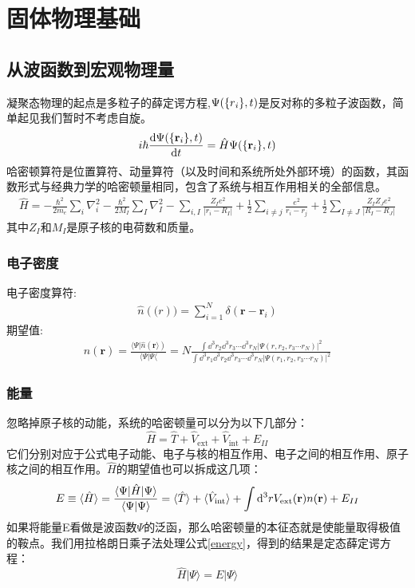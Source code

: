 \chapter{固体物理基础}
\section{从波函数到宏观物理量}
凝聚态物理的起点是多粒子的薛定谔方程,$\Psi(\{ \mathbf{\emph{$r$}}_i\},t)$是反对称的多粒子波函数，简单起见我们暂时不考虑自旋。
\begin{align}
    i\hbar\dv{\Psi(\{ \mathbf{r}_i\},t)}{t}=\hat{H}\Psi(\{ \mathbf{r}_i\},t)
    \label{hamiltonian}
\end{align}
哈密顿算符是位置算符、动量算符（以及时间和系统所处外部环境）的函数，其函数形式与经典力学的哈密顿量相同，包含了系统与相互作用相关的全部信息。
\begin{align}
    \hat{H}=-\frac{\hbar^2}{2m_e}\sum_i \nabla_{i}^{2}-\frac{\hbar^2}{2M_I}\sum_I \nabla_{I}^{2}-\sum_{i,I}\frac{Z_Ie^2}{|r_i-R_I|}+\frac{1}{2}\sum_{i\neq j}\frac{e^2}{r_i-r_j}+\frac{1}{2}\sum_{I\neq J}\frac{Z_IZ_Je^2}{|R_I-R_J|}
\end{align}
其中$Z_I$和$M_I$是原子核的电荷数和质量。
\subsection{电子密度}
电子密度算符:
\begin{gather}
    \hat{n}(\mathbf(r))=\sum_{i=1}^{N}\delta(\mathbf{r}-\mathbf{r}_i)
    \end{gather}
    期望值:
    \begin{gather}
    n(\mathbf{r})=\frac{\langle\Psi|\hat{n}(\mathbf{r}\rangle)}{\langle\Psi|\Psi\langle}
    =N\frac{\int \dd^3r_2\dd^3r_3\cdots\dd^3r_N|\Psi({r,r_2,r_3\cdots r_N})|^2}{\int \dd^3r_1\dd^3r_2\dd^3r_3\cdots\dd^3r_N|\Psi({r_1,r_2,r_3\cdots r_N})|^2}
\end{gather}
\subsection{能量}
忽略掉原子核的动能，系统的哈密顿量可以分为以下几部分：
\begin{equation}
    \hat{H}=\hat{T}+\hat{V}_{\text{ext}}+\hat{V}_{\text{int}}+E_{II}
\end{equation}
它们分别对应于公式电子动能、电子与核的相互作用、电子之间的相互作用、原子核之间的相互作用。$\hat{H}$的期望值也可以拆成这几项：
\begin{equation}
    E\equiv \langle\hat{H}\rangle=\frac{\langle\Psi|\emph{$\hat{H}$}|\Psi\rangle}{\langle\Psi|\Psi\rangle}=\langle\hat{T}\rangle+\langle\hat{V}_{\text{int}}\rangle+\int \dd^3r V_{\text{ext}}(\mathbf{r})n(\mathbf{r})+E_{II}
    \label{energy}
\end{equation}
如果将能量E看做是波函数$\Psi$的泛函，那么哈密顿量的本征态就是使能量取得极值的鞍点。我们用拉格朗日乘子法处理公式\ref{energy}，得到的结果是定态薛定谔方程：
\begin{equation}
    \hat{H}|\Psi\rangle=E|\Psi\rangle
\end{equation}
